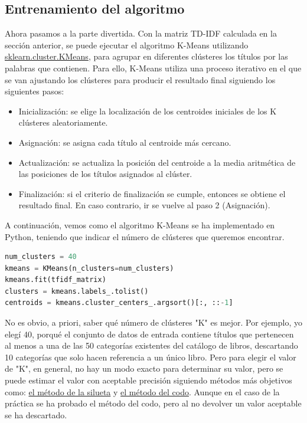 \documentclass{uimppracticas}
\begin{document}
\subsection{Entrenamiento del algoritmo}

Ahora pasamos a la parte divertida. Con la matriz TD-IDF calculada en la sección anterior, se puede ejecutar el algoritmo K-Means utilizando \href{https://scikit-learn.org/stable/modules/generated/sklearn.cluster.KMeans.html}{sklearn.cluster.KMeans}, para agrupar en diferentes clústeres los títulos por las palabras que contienen. Para ello, K-Means utiliza una proceso iterativo en el que se van ajustando los clústeres para producir el resultado final siguiendo los siguientes pasos:

\begin{itemize}
	\item Inicialización: se elige la localización de los centroides iniciales de los K clústeres aleatoriamente.
	\item Asignación: se asigna cada título al centroide más cercano.
	\item Actualización: se actualiza la posición del centroide a la media aritmética de las posiciones de los títulos asignados al clúster.
	\item Finalización: si el criterio de finalización se cumple, entonces se obtiene el resultado final. En caso contrario, ir se vuelve al paso 2 (Asignación).
\end{itemize}

A continuación, vemos como el algoritmo K-Means se ha implementado en Python, teniendo que indicar el número de clústeres que queremos encontrar.

\begin{lstlisting}[language=python, basicstyle=\small]
num_clusters = 40
kmeans = KMeans(n_clusters=num_clusters)
kmeans.fit(tfidf_matrix)
clusters = kmeans.labels_.tolist()
centroids = kmeans.cluster_centers_.argsort()[:, ::-1]
\end{lstlisting}

No es obvio, a priori, saber qué número de clústeres "K" es mejor. Por ejemplo, yo elegí 40, porqué el conjunto de datos de entrada contiene títulos que pertenecen al menos a una de las 50 categorías existentes del catálogo de libros, descartando 10 categorías que solo hacen referencia a un único libro. Pero para elegir el valor de "K", en general, no hay un modo exacto para determinar su valor, pero se puede estimar el valor con aceptable precisión siguiendo métodos más objetivos como: \href{https://en.wikipedia.org/wiki/Silhouette_(clustering)}{el método de la silueta} y \href{https://en.wikipedia.org/wiki/Elbow_method_(clustering)}{el método del codo}. Aunque en el caso de la práctica se ha probado el método del codo, pero al no devolver un valor aceptable se ha descartado.  
\end{document}
